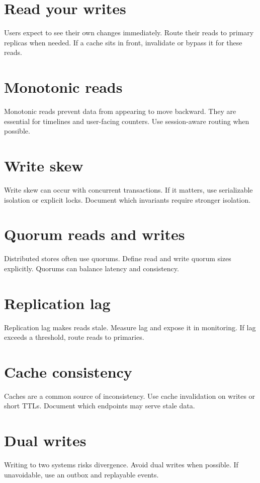 \section{Read your writes}
Users expect to see their own changes immediately.
Route their reads to primary replicas when needed.
If a cache sits in front, invalidate or bypass it for these reads.

\section{Monotonic reads}
Monotonic reads prevent data from appearing to move backward.
They are essential for timelines and user-facing counters.
Use session-aware routing when possible.

\section{Write skew}
Write skew can occur with concurrent transactions.
If it matters, use serializable isolation or explicit locks.
Document which invariants require stronger isolation.

\section{Quorum reads and writes}
Distributed stores often use quorums.
Define read and write quorum sizes explicitly.
Quorums can balance latency and consistency.

\section{Replication lag}
Replication lag makes reads stale.
Measure lag and expose it in monitoring.
If lag exceeds a threshold, route reads to primaries.

\section{Cache consistency}
Caches are a common source of inconsistency.
Use cache invalidation on writes or short TTLs.
Document which endpoints may serve stale data.

\section{Dual writes}
Writing to two systems risks divergence.
Avoid dual writes when possible.
If unavoidable, use an outbox and replayable events.

